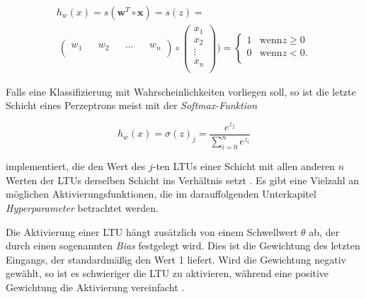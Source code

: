 \begin{equation} \label{heaviside}
\begin{split}
h_{w}(x) = s(\boldsymbol{w}^{T} \circ \boldsymbol{x}) = s(z) = \\\ \begin{pmatrix} 
w_{1}&&w_{2}&&\dots&& w_{n}\\ 
\end{pmatrix} 
\circ 
\begin{pmatrix} x_{1}\\
x_{2}\\
\vdots\\
x_{n}\\
\end{pmatrix}) = 
\begin{cases}
1 & \text{wenn} z \geq 0 \\
0 & \text{wenn} z < 0 .\\
\end{cases}
\end{split}
\end{equation}

Falls eine Klassifizierung mit Wahrscheinlichkeiten vorliegen soll, so ist die letzte Schicht eines Perzeptrons meist mit der \textit{Softmax-Funktion}

\begin{equation}
h_{w}(x) = \sigma(z)_j = \frac{e^{z_j}}{\sum_{i=0}^n e^{z_i} }
\end{equation}

implementiert, die den Wert des $j$-ten LTUs einer Schicht mit allen anderen $n$ Werten der LTUs derselben Schicht ins Verhältnis setzt \cite{AurelienGeron.2018}. Es gibt eine Vielzahl an möglichen Aktivierungsfunktionen, die im darauffolgenden Unterkapitel \textit{Hyperparameter} betrachtet werden.

Die Aktivierung einer LTU hängt zusätzlich von einem Schwellwert $\theta$ ab, der durch einen sogenannten \textit{Bias} festgelegt wird. Dies ist die Gewichtung des letzten Eingangs, der standardmäßig den Wert 1 liefert. Wird die Gewichtung negativ gewählt, so ist es schwieriger die LTU zu aktivieren, während eine positive Gewichtung die Aktivierung vereinfacht \cite{AurelienGeron.2018}.

